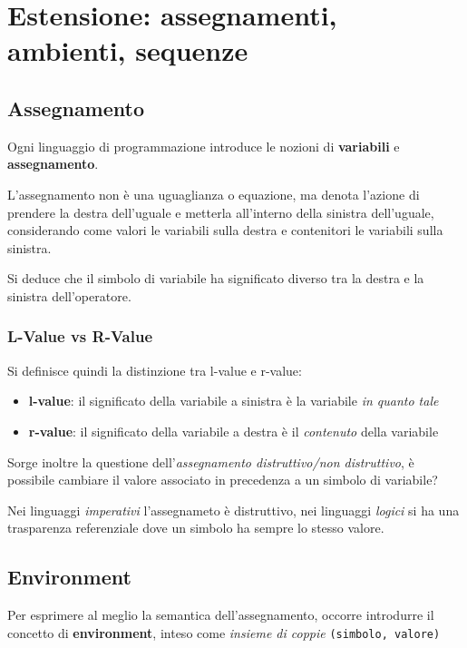 \chapter{Estensione: assegnamenti, ambienti, sequenze}

\section{Assegnamento}
Ogni linguaggio di programmazione introduce le nozioni di \textbf{variabili} e \textbf{assegnamento}.

L'assegnamento non è una uguaglianza o equazione, ma denota l'azione di prendere la destra dell'uguale e metterla all'interno della sinistra dell'uguale, considerando come valori le variabili sulla destra e contenitori le variabili sulla sinistra.

Si deduce che il simbolo di variabile ha significato diverso tra la destra e la sinistra dell'operatore.

\subsection{L-Value vs R-Value}
Si definisce quindi la distinzione tra l-value e r-value:
\begin{itemize}
    \item \textbf{l-value}: il significato della variabile a sinistra è la variabile \textit{in quanto tale}
    \item \textbf{r-value}: il significato della variabile a destra è il \textit{contenuto} della variabile
\end{itemize}

Sorge inoltre la questione dell'\textit{assegnamento distruttivo/non distruttivo}, è possibile cambiare il valore associato in precedenza a un simbolo di variabile?

Nei linguaggi \textit{imperativi} l'assegnameto è distruttivo, nei linguaggi \textit{logici} si ha una trasparenza referenziale dove un simbolo ha sempre lo stesso valore.

\section{Environment}
Per esprimere al meglio la semantica dell'assegnamento, occorre introdurre il concetto di \textbf{environment}, inteso come \textit{insieme di coppie} \texttt{(simbolo, valore)}

































